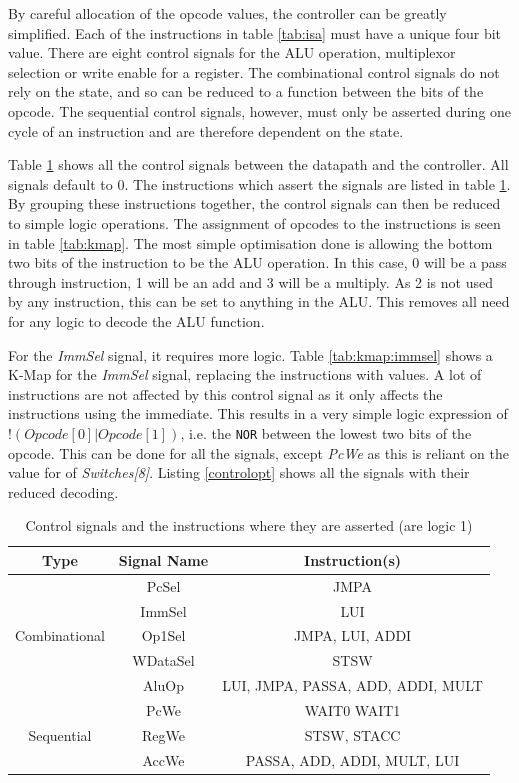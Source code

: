 By careful allocation of the opcode values, the controller can be greatly simplified. 
Each of the instructions in table \ref{tab:isa} must have a unique four bit value. 
There are eight control signals for the ALU operation, multiplexor selection or write enable for a register. 
The combinational control signals do not rely on the state, and so can be reduced to a function between the bits of the opcode. 
The sequential control signals, however, must only be asserted during one cycle of an instruction and are therefore dependent on the state. 

Table \ref{tab:controlsignals} shows all the control signals between the datapath and the controller. 
All signals default to 0.
The instructions which assert the signals are listed in table \ref{tab:controlsignals}. 
By grouping these instructions together, the control signals can then be reduced to simple logic operations.
The assignment of opcodes to the instructions is seen in table \ref{tab:kmap}. 
The most simple optimisation done is allowing the bottom two bits of the instruction to be the ALU operation. 
In this case, 0 will be a pass through instruction, 1 will be an add and 3 will be a multiply. 
As 2 is not used by any instruction, this can be set to anything in the ALU.
This removes all need for any logic to decode the ALU function. 

For the \textit{ImmSel} signal, it requires more logic. 
Table \ref{tab:kmap:immsel} shows a K-Map for the \textit{ImmSel} signal, replacing the instructions with values.
A lot of instructions are not affected by this control signal as it only affects the instructions using the immediate. 
This results in a very simple logic expression of $!(Opcode[0] | Opcode[1])$, i.e. the \texttt{NOR} between the lowest two bits of the opcode. 
This can be done for all the signals, except \textit{PcWe} as this is reliant on the value for of \textit{Switches[8]}. 
Listing \ref{controlopt} shows all the signals with their reduced decoding. 

\begin{table}
\caption{Control signals and the instructions where they are asserted (are logic 1)}
\label{tab:controlsignals}
\centering
\begin{tabular}{|c|c|c|} \hline
Type & Signal Name & Instruction(s) \\ \hline
\multirow{5}{*}{Combinational} & PcSel & JMPA \\ 
 & ImmSel & LUI \\
 & Op1Sel & JMPA, LUI, ADDI \\
 & WDataSel & STSW \\ 
 & AluOp & LUI, JMPA, PASSA, ADD, ADDI, MULT \\ \hline
\multirow{3}{*}{Sequential} & PcWe & WAIT0 WAIT1 \\
 & RegWe & STSW, STACC \\
 & AccWe &  PASSA, ADD, ADDI, MULT, LUI \\ \hline

\end{tabular}
\end{table}

